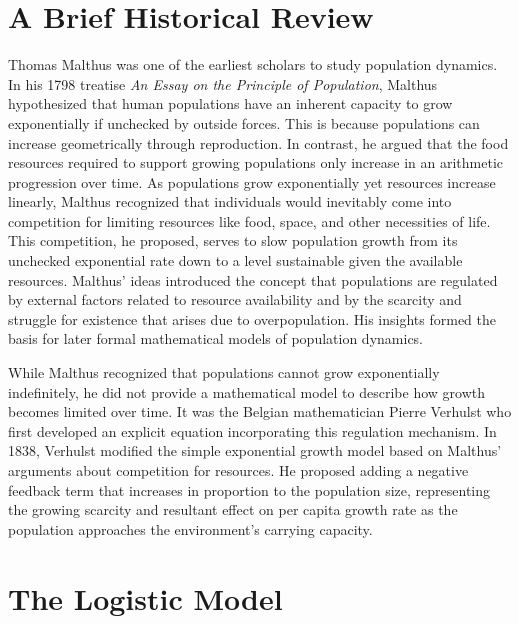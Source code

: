 \section{A Brief Historical Review}

Thomas Malthus was one of the earliest scholars to study population dynamics. In his 1798 treatise \emph{An Essay on the Principle of Population}, Malthus hypothesized that human populations have an inherent capacity to grow exponentially if unchecked by outside forces. This is because populations can increase geometrically through reproduction. In contrast, he argued that the food resources required to support growing populations only increase in an arithmetic progression over time. As populations grow exponentially yet resources increase linearly, Malthus recognized that individuals would inevitably come into competition for limiting resources like food, space, and other necessities of life. This competition, he proposed, serves to slow population growth from its unchecked exponential rate down to a level sustainable given the available resources. Malthus' ideas introduced the concept that populations are regulated by external factors related to resource availability and by the scarcity and struggle for existence that arises due to overpopulation. His insights formed the basis for later formal mathematical models of population dynamics.

While Malthus recognized that populations cannot grow exponentially indefinitely, he did not provide a mathematical model to describe how growth becomes limited over time. It was the Belgian mathematician Pierre Verhulst who first developed an explicit equation incorporating this regulation mechanism. In 1838, Verhulst modified the simple exponential growth model based on Malthus' arguments about competition for resources. He proposed adding a negative feedback term that increases in proportion to the population size, representing the growing scarcity and resultant effect on per capita growth rate as the population approaches the environment's carrying capacity.

\section{The Logistic Model}

